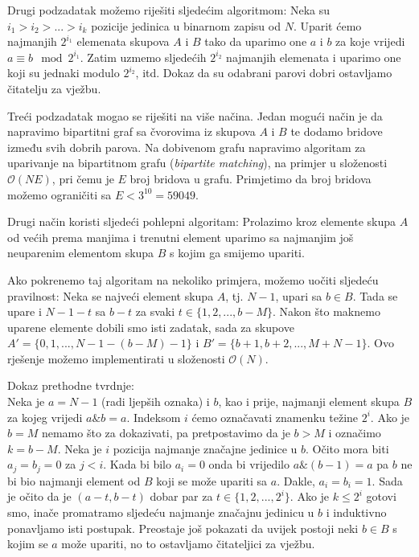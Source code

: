 \documentclass[a4paper]{article}
\begin{document}
Drugi podzadatak možemo riješiti sljedećim algoritmom: Neka su
$i_1 > i_2 > ... > i_k$ pozicije jedinica u binarnom zapisu od $N$. Uparit ćemo
najmanjih $2^{i_1}$ elemenata skupova $A$ i $B$ tako da uparimo one $a$ i $b$
za koje vrijedi $a \equiv b \mod 2^{i_1}$. Zatim uzmemo sljedećih $2^{i_2}$
najmanjih elemenata i uparimo one koji su jednaki modulo $2^{i_2}$, itd.
Dokaz da su odabrani parovi dobri ostavljamo čitatelju za vježbu.

Treći podzadatak mogao se riješiti na više načina. Jedan mogući način je da
napravimo bipartitni graf sa čvorovima iz skupova $A$ i $B$ te dodamo bridove
između svih dobrih parova. Na dobivenom grafu napravimo algoritam za uparivanje
na bipartitnom grafu (\emph{bipartite matching}), na primjer u složenosti
$\mathcal{O}(NE)$, pri čemu je $E$ broj bridova u grafu.
Primjetimo da broj bridova možemo ograničiti sa $E < 3^{10} = 59049$.

Drugi način koristi sljedeći pohlepni algoritam: Prolazimo kroz elemente skupa
$A$ od većih prema manjima i trenutni element uparimo sa najmanjim još
neuparenim elementom skupa $B$ s kojim ga smijemo upariti.

Ako pokrenemo taj algoritam na nekoliko primjera, možemo uočiti sljedeću
pravilnost: Neka se najveći element skupa $A$, tj. $N - 1$, upari sa $b \in B$.
Tada se upare i $N - 1 - t$ sa $b - t$ za svaki $t \in \{1, 2, ..., b - M\}$.
Nakon što maknemo uparene elemente dobili smo isti zadatak, sada za skupove
$A' = \{0, 1, ..., N - 1 - (b - M) - 1\}$ i
$B' = \{b + 1, b + 2, ..., M + N - 1\}$. Ovo rješenje možemo implementirati u
složenosti $\mathcal{O}(N)$.

Dokaz prethodne tvrdnje:\\
Neka je $a = N - 1$ (radi ljepših oznaka) i $b$, kao i prije, najmanji element
skupa $B$ za kojeg vrijedi $a \mathbin\& b = a$. Indeksom $i$ ćemo označavati znamenku
težine $2^i$. Ako je $b = M$ nemamo što za dokazivati, pa pretpostavimo da je
$b > M$ i označimo $k = b - M$. Neka je $i$ pozicija najmanje značajne jedinice u $b$.
Očito mora biti $a_j = b_j = 0$ za $j < i$. Kada bi bilo $a_i = 0$ onda bi vrijedilo
$a \mathbin\& (b - 1) = a$ pa $b$ ne bi bio najmanji element od $B$ koji se može upariti
sa $a$. Dakle, $a_i = b_i = 1$. Sada je očito da je $(a - t, b - t)$ dobar par za
$t \in \{1, 2, ..., 2^i\}$. Ako je $k \leq 2^i$ gotovi smo, inače promatramo sljedeću
najmanje značajnu jedinicu u $b$ i induktivno ponavljamo isti postupak.
Preostaje još pokazati da uvijek postoji neki $b \in B$ s kojim se $a$ može upariti, no
to ostavljamo čitateljici za vježbu.
\end{document}
